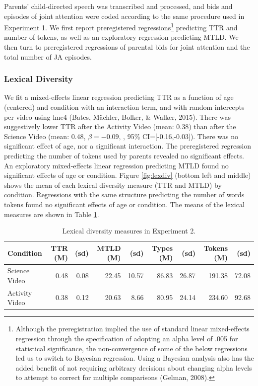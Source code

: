 \documentclass[man,floatsintext]{apa6}
\let\rmarkdownfootnote\footnote%
\def\footnote{\protect\rmarkdownfootnote}
\begin{document}
Parents' child-directed speech was transcribed and processed, and bids and episodes of joint attention were coded according to the same procedure used in Experiment 1.
We first report preregistered regressions\footnote{Although the preregistration implied the use of standard linear mixed-effects regression through the specification of adopting an alpha level of .005 for statistical significance, the non-convergence of some of the below regressions led us to switch to Bayesian regression. Using a Bayesian analysis also has the added benefit of not requiring arbitrary decisions about changing alpha levels to attempt to correct for multiple comparisons (Gelman, 2008).} predicting TTR and number of tokens, as well as an exploratory regression predicting MTLD.
We then turn to preregistered regressions of parental bids for joint attention and the total number of JA episodes.

\hypertarget{lexical-diversity-1}{%
\subsubsection{Lexical Diversity}\label{lexical-diversity-1}}

We fit a mixed-effects linear regression predicting TTR as a function of age (centered) and condition with an interaction term, and with random intercepts per video using lme4 (Bates, Mächler, Bolker, \& Walker, 2015).
There was suggestively lower TTR after the Activity Video (mean: 0.38) than after the Science Video (mean: 0.48, \(\beta=-0.09\), , 95\% CI={[}-0.16,-0.03{]}).
There was no significant effect of age, nor a significant interaction.
The preregistered regression predicting the number of tokens used by parents revealed no significant effects.
An exploratory mixed-effects linear regression predicting MTLD found no significant effects of age or condition.
Figure \ref{fig:lexdiv} (bottom left and middle) shows the mean of each lexical diversity measure (TTR and MTLD) by condition.
Regressions with the same structure predicting the number of words tokens found no significant effects of age or condition.
The means of the lexical measures are shown in Table \ref{e2tab}.

\begin{table}[t]

\caption{\label{tab:e2tab}\label{e2tab} Lexical diversity measures in Experiment 2.}
\centering
\begin{tabular}{l|r|r|r|r|r|r|r|r}
\hline
Condition & TTR (M) & (sd) & MTLD (M) & (sd) & Types (M) & (sd) & Tokens (M) & (sd)\\
\hline
Science Video & 0.48 & 0.08 & 22.45 & 10.57 & 86.83 & 26.87 & 191.38 & 72.08\\
\hline
Activity Video & 0.38 & 0.12 & 20.63 & 8.66 & 80.95 & 24.14 & 234.60 & 92.68\\
\hline
\end{tabular}
\end{table}
\end{document}
